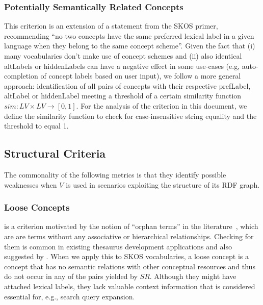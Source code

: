 \subsubsection{Potentially Semantically Related Concepts} 
This criterion is an extension of a statement from the SKOS primer, recommending ``no two concepts have the same preferred lexical label in a given language when they belong to the same concept scheme''. Given the fact that (i) many vocabularies don’t make use of concept schemes and (ii) also identical altLabels or hiddenLabels can have a negative effect in some use-cases (e.g, auto-completion of concept labels based on user input), we follow a more general approach: identification of all pairs of concepts with their respective prefLabel, altLabel or hiddenLabel meeting a threshold of a certain similarity function $sim:LV \times LV \rightarrow [0,1]$. For the analysis of the criterion in this document, we define the similarity function  to check for case-insensitive string equality and the threshold to equal 1.


\subsection{Structural Criteria}

The commonality of the following metrics is that they identify possible weaknesses when $V$ is used in scenarios exploiting the structure of its RDF graph. 

\subsubsection{Loose Concepts} is a criterion motivated by the notion of ``orphan terms'' in the literature~\cite{Hedden2010}, which are are terms without any associative or hierarchical relationships. Checking for them is common in existing thesaurus development applications and also suggested by \cite{Z39.19:2005}. When we apply this to SKOS vocabularies, a loose concept is a concept that has no semantic relations with other conceptual resources and thus do not occur in any of the pairs yielded by $SR$. Although they might have attached lexical labels, they lack valuable context information that is considered essential for, e.g., search query expansion. 


